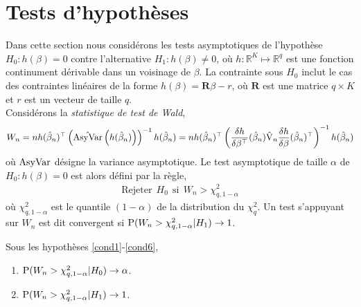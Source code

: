 \section{Tests d'hypothèses}
Dans cette section nous considérons les tests asymptotiques de l'hypothèse $H_0: h(\beta) = 0$ contre l'alternative 
 $H_1: h(\beta) \neq 0$, où $h: \mathbb{R}^K \mapsto \mathbb{R}^q$ est une fonction continument dérivable dans un voisinage de $\beta$. La contrainte sous $H_0$ inclut le cas des contraintes linéaires de la forme $h(\beta) = \mathbf{R}\beta - r$, où $\mathbf{R}$ est une matrice $q\times K$ et $r$ est un vecteur de taille $q$.\\ 
Considérons la \emph{statistique de test de Wald},
\begin{align*}
 W_n = nh(\hat{\beta}_n)^\top \left(\hat{\mathrm{AsyVar}}\left(h(\hat{\beta}_n)\right)\right)^{-1}h(\hat{\beta}_n) = n h(\hat{\beta}_n)^\top\left(\frac{\delta h}{\delta \beta ^ \top}(\hat{\beta}_n)\hat{\operatorname{V}}_n \frac{\delta h}{\delta \beta}(\hat{\beta}_n)^\top \right)^{-1} h(\hat{\beta}_n)
\end{align*}
où $\mathrm{AsyVar}$ désigne la variance asymptotique. Le test asymptotique de taille $\alpha$ de $H_0: h(\beta) = 0$ est alors défini par la règle,
\begin{align*}
\textrm{Rejeter} \ \ H_0 \ \ \textrm{si} \ \ W_n > \chi^2_{q, 1- \alpha}
\end{align*}
où $\chi^2_{q, 1- \alpha}$ est le quantile $(1-\alpha)$ de la distribution du $\chi^2_q$. Un test s'appuyant sur  $W_n$ est dit convergent si $\operatorname{P}(W_n > \chi^2_{q, 1- \alpha} | H_1) \rightarrow 1$.
\begin{propriete}\label{pr3}
Sous les hypothèses \ref{cond1}-\ref{cond6},
\begin{enumerate}
\item\label{pr3a} $\operatorname{P}(W_n > \chi^2_{q, 1- \alpha} | H_0) \rightarrow \alpha$.
\item\label{pr3b} $\operatorname{P}(W_n > \chi^2_{q, 1- \alpha} | H_1) \rightarrow 1$.
\end{enumerate}
\end{propriete}
